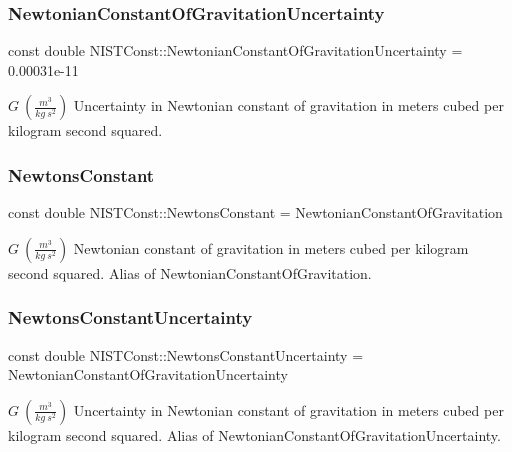 \subsubsection{\texorpdfstring{Newtonian\+Constant\+Of\+Gravitation\+Uncertainty}{NewtonianConstantOfGravitationUncertainty}}
{\footnotesize\ttfamily const double N\+I\+S\+T\+Const\+::\+Newtonian\+Constant\+Of\+Gravitation\+Uncertainty = 0.\+00031e-\/11}

$G \ (\frac{m^3}{kg\ s^2})$ Uncertainty in Newtonian constant of gravitation in meters cubed per kilogram second squared. \mbox{\label{group___gravitational_constant_ga3d83beb8e9a1e0970e5520fe8ca1ace5}} 
\subsubsection{\texorpdfstring{Newtons\+Constant}{NewtonsConstant}}
{\footnotesize\ttfamily const double N\+I\+S\+T\+Const\+::\+Newtons\+Constant = Newtonian\+Constant\+Of\+Gravitation}

$G \ (\frac{m^3}{kg\ s^2})$ Newtonian constant of gravitation in meters cubed per kilogram second squared. Alias of Newtonian\+Constant\+Of\+Gravitation. \mbox{\label{group___gravitational_constant_ga53c7e14bc44763cb827de59cd3bcff2b}} 
\subsubsection{\texorpdfstring{Newtons\+Constant\+Uncertainty}{NewtonsConstantUncertainty}}
{\footnotesize\ttfamily const double N\+I\+S\+T\+Const\+::\+Newtons\+Constant\+Uncertainty = Newtonian\+Constant\+Of\+Gravitation\+Uncertainty}

$G \ (\frac{m^3}{kg\ s^2})$ Uncertainty in Newtonian constant of gravitation in meters cubed per kilogram second squared. Alias of Newtonian\+Constant\+Of\+Gravitation\+Uncertainty. \mbox{\label{group___gravitational_constant_ga8d7552c043dbeda8e536ba6a01af9829}} 
